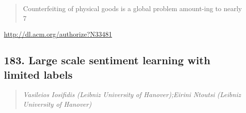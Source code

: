 \documentclass{article}
\begin{document}
\begin{quote}
Counterfeiting of physical goods is a global problem amount-ing to nearly 7%
\end{quote}

\href{http://dl.acm.org/authorize?N33481}{http://dl.acm.org/authorize?N33481}

\subsection{183. Large scale sentiment learning with limited labels}

\begin{quote}
\footnotesize{\textit{Vasileios Iosifidis (Leibniz University of Hanover);Eirini Ntoutsi (Leibniz University of Hanover)}}

\end{quote}
\end{document}
